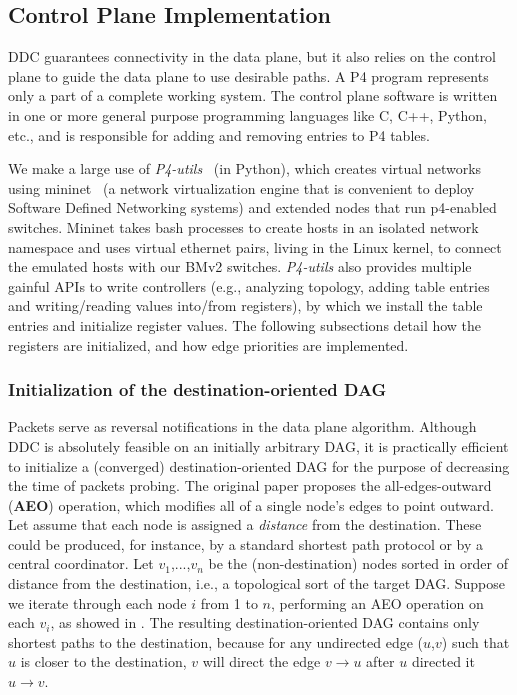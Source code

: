 \subsection{Control Plane Implementation}
\label{sec:control}
DDC guarantees connectivity in the data plane, but it also relies on the control plane to guide the data plane to use desirable paths. A P4 program represents only a part of a complete working system. The control plane software is written in one or more general purpose programming languages like C, C++, Python, etc., and is responsible for adding and removing entries to P4 tables. 

We make a large use of \textit{P4-utils}~\cite{p4-utils} (in Python), which creates virtual networks using mininet~\cite{mininet} (a network virtualization engine that is convenient to deploy Software Defined Networking systems) and extended nodes that run p4-enabled switches. 
Mininet takes bash processes to create hosts in an isolated network namespace and uses virtual ethernet pairs, living in the Linux kernel, to connect the emulated hosts with our BMv2 switches.
\textit{P4-utils} also provides multiple gainful APIs to write controllers (e.g., analyzing topology, adding table entries and writing/reading values into/from registers), by which we install the table entries and initialize register values. 
The following subsections detail how the \ld registers are initialized, and how edge priorities are implemented.

\subsubsection{Initialization of the destination-oriented DAG}
Packets serve as reversal notifications in the data plane algorithm. Although DDC is absolutely feasible on an initially arbitrary DAG, it is practically efficient to initialize a (converged) destination-oriented DAG for the purpose of decreasing the time of packets probing. The original paper proposes the all-edges-outward (\textbf{AEO}) operation, which modifies all of a single node’s edges to point outward. Let assume that each node is assigned a \textit{distance} from the destination. These could be produced, for instance, by a standard shortest path protocol or by a central coordinator.  Let $v_1$,...,$v_n$ be the (non-destination) nodes sorted in order of distance from the destination, i.e., a topological sort of the target DAG. Suppose we iterate through each node $i$ from 1 to $n$, performing an AEO operation on each $v_i$, as showed in . The resulting destination-oriented DAG contains only shortest paths to the destination, because for any undirected edge ($u$,$v$) such that $u$ is closer to the destination, $v$ will direct the edge $v \rightarrow u$ after $u$ directed it $u \rightarrow v$.

